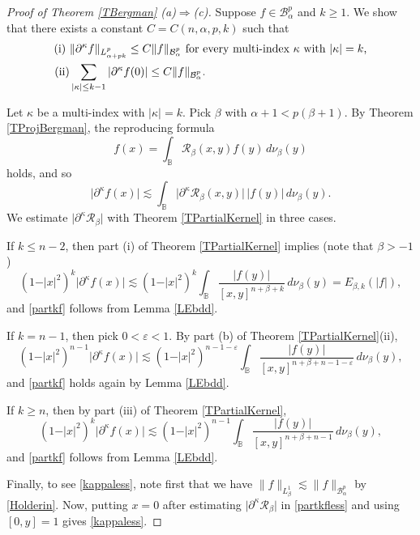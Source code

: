\documentclass{amsart}
\theoremstyle{definition}
\theoremstyle{remark}
\begin{document}
\begin{proof}[Proof of Theorem \ref{TBergman} (a)$\Rightarrow$(c)]
Suppose $f\in\mathcal B^p_\alpha$ and $k\ge 1$.
We show that there exists a constant $C=C(n,\alpha,p,k)$ such that
\begin{align}
\textup{(i)}\ &\|\partial^\kappa f\|_{L^p_{\alpha+pk}}\le C \|f\|_{\mathcal B^p_\alpha}
\ \text{for every multi-index $\kappa$ with $\vert\kappa\vert=k$,}\label{partkf}\\
\textup{(ii)} &\sum_{\vert\kappa\vert\le k-1}\vert\partial^\kappa f(0)\vert
\le C \|f\|_{\mathcal B^p_\alpha}.\label{kappaless}
\end{align}

Let $\kappa$ be a multi-index with $\vert\kappa\vert=k$.
Pick $\beta$ with $\alpha+1<p(\beta+1)$.
By Theorem \ref{TProjBergman}, the reproducing formula
\begin{equation}\label{reprform}
f(x)=\int_{\mathbb B}\mathcal R_\beta(x,y)f(y)\,d\nu_\beta(y)
\end{equation}
holds, and so
\begin{equation}\label{partkfless}
\vert\partial^\kappa f(x)\vert
\lesssim \int_{\mathbb B}
\vert\partial^\kappa\mathcal R_\beta(x,y)\vert\,\vert f(y)\vert\,d\nu_\beta(y).
\end{equation}
We estimate $\vert\partial^\kappa \mathcal R_\beta\vert$ with
Theorem \ref{TPartialKernel} in three cases.

If $k\le n-2$, then part (i) of Theorem \ref{TPartialKernel} implies
(note that $\beta>-1$)
\begin{equation*}
(1-\vert x\vert^2)^k\vert\partial^\kappa f(x)\vert
\lesssim (1-\vert x\vert^2)^k \int_{\mathbb B}
\frac{\vert f(y)\vert}{[x,y]^{n+\beta+k}}\,d\nu_\beta(y)
=E_{\beta,k}(\vert f\vert),
\end{equation*}
and \eqref{partkf} follows from Lemma \ref{LEbdd}.

If $k=n-1$, then pick $0<\varepsilon<1$.
By part (b) of Theorem \ref{TPartialKernel}(ii),
\begin{equation*}
(1-\vert x\vert^2)^{n-1}\vert\partial^\kappa f(x)\vert
\lesssim (1-\vert x\vert^2)^{n-1-\varepsilon} \int_{\mathbb B}
\frac{\vert f(y)\vert}{[x,y]^{n+\beta+n-1-\varepsilon}}\,d\nu_\beta(y),
\end{equation*}
and \eqref{partkf} holds again by Lemma \ref{LEbdd}.

If $k\ge n$, then by part (iii) of Theorem \ref{TPartialKernel},
\begin{equation*}
(1-\vert x\vert^2)^k\vert\partial^\kappa f(x)\vert
\lesssim (1-\vert x\vert^2)^{n-1} \int_{\mathbb B}
\frac{\vert f(y)\vert}{[x,y]^{n+\beta+n-1}}\,d\nu_\beta(y),
\end{equation*}
and \eqref{partkf} follows from Lemma \ref{LEbdd}.

Finally, to see \eqref{kappaless}, note first that we have
$\|f\|_{L^1_\beta}\lesssim \|f\|_{\mathcal B^p_\alpha}$
by \eqref{Holderin}.
Now, putting $x=0$ after estimating $\vert\partial^\kappa\mathcal R_\beta\vert$
in \eqref{partkfless} and using $[0,y]=1$ gives \eqref{kappaless}.
\end{proof}
\end{document}
